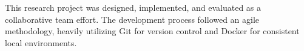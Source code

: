 This research project was designed, implemented, and evaluated as a collaborative team effort. The development process followed an agile methodology, heavily utilizing Git for version control and Docker for consistent local environments.